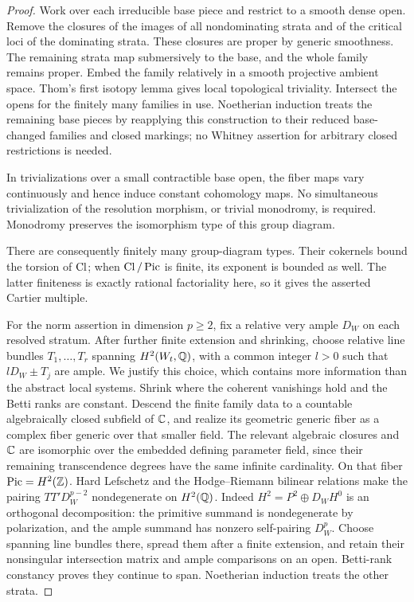 \begin{proof}
Work over each irreducible base piece and restrict to a smooth dense
open. Remove the closures of the
images of all nondominating strata and of the critical loci of the
dominating strata. These closures are proper by generic smoothness.
The remaining strata map submersively to the base, and the whole
family remains proper. Embed the family relatively in a smooth
projective ambient space. Thom's first isotopy lemma
\cite[Proposition~11.1]{MatherTopological} gives local topological
triviality. Intersect the opens for the finitely many families in use.
Noetherian induction treats the remaining base pieces by reapplying
this construction to their reduced base-changed families and closed
markings; no Whitney assertion for arbitrary closed restrictions is
needed.

In trivializations over a small contractible base open, the fiber
maps vary continuously and hence induce constant cohomology maps.
No simultaneous trivialization of the resolution morphism, or trivial
monodromy, is required. Monodromy preserves the isomorphism type of
this group diagram.

There are consequently finitely many group-diagram types.
Their cokernels bound the torsion of \(\operatorname{Cl}\); when
\(\operatorname{Cl}/\operatorname{Pic}\) is finite, its exponent is bounded as well.
The latter finiteness is exactly rational factoriality here,
so it gives the asserted Cartier multiple.

For the norm assertion in dimension \(p\ge2\), fix a relative very
ample \(D_W\) on each resolved stratum. After further finite
extension and shrinking, choose relative line bundles
\(T_1,\ldots,T_r\) spanning \(H^2(W_t,\mathbb Q)\), with a common integer
\(l>0\) such that \(lD_W\pm T_j\) are ample. We justify this choice,
which contains more information than the abstract local systems.
Shrink where the coherent vanishings hold and the Betti ranks are
constant. Descend the finite family data to a countable
algebraically closed subfield of \(\mathbb C\), and realize its geometric
generic fiber as a complex fiber generic over that smaller field.
The relevant algebraic closures and \(\mathbb C\) are isomorphic over the
embedded defining parameter field, since their remaining
transcendence degrees have the same infinite cardinality.
On that fiber \(\operatorname{Pic}=H^2(\mathbb Z)\). Hard Lefschetz and the
Hodge--Riemann bilinear relations
\cite[Theorem~3.1.2(a)--(c)]{DeCataldoMiglioriniHodge} make the
pairing \(TT'D_W^{p-2}\) nondegenerate on \(H^2(\mathbb Q)\).
Indeed \(H^2=P^2\oplus D_WH^0\) is an orthogonal decomposition:
the primitive summand is nondegenerate by polarization, and the
ample summand has nonzero self-pairing \(D_W^p\).
Choose spanning line bundles there, spread them after a finite
extension, and retain their nonsingular intersection matrix and
ample comparisons on an open. Betti-rank constancy proves they
continue to span. Noetherian induction treats the other strata.


\end{proof}
